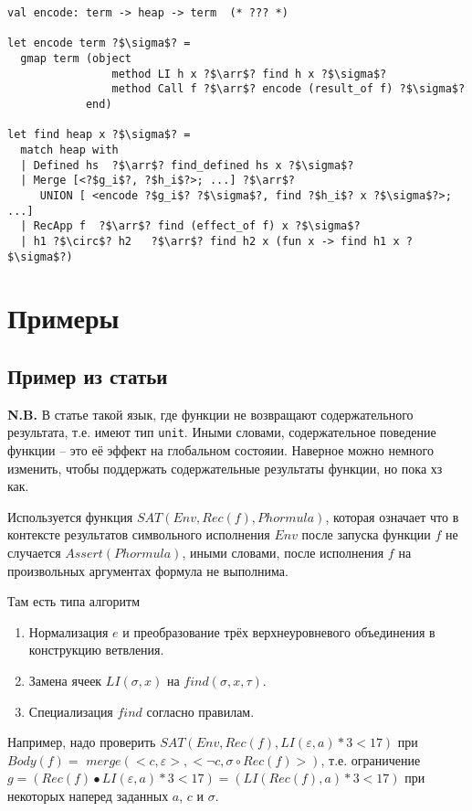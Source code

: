 \documentclass{article}
\newcommand*{\arr}{\ensuremath{\rightarrow}}
\begin{document}
\begin{verbatim}  
val encode: term -> heap -> term  (* ??? *)

let encode term ?$\sigma$? = 
  gmap term (object 
                method LI h x ?$\arr$? find h x ?$\sigma$? 
                method Call f ?$\arr$? encode (result_of f) ?$\sigma$? 
            end)

let find heap x ?$\sigma$? =
  match heap with 
  | Defined hs  ?$\arr$? find_defined hs x ?$\sigma$? 
  | Merge [<?$g_i$?, ?$h_i$?>; ...] ?$\arr$? 
     UNION [ <encode ?$g_i$? ?$\sigma$?, find ?$h_i$? x ?$\sigma$?>; ...]
  | RecApp f  ?$\arr$? find (effect_of f) x ?$\sigma$?
  | h1 ?$\circ$? h2   ?$\arr$? find h2 x (fun x -> find h1 x ?$\sigma$?)
\end{verbatim}

\section{Примеры}
\subsection{Пример из статьи}

\textbf{N.B.} В статье такой язык, где функции не возвращают содержательного результата, т.е. имеют тип \texttt{unit}. Иными словами, содержательное поведение функции -- это её эффект на глобальном состояии. Наверное можно немного изменить, чтобы поддержать содержательные результаты функции, но пока хз как.

Используется функция $SAT(Env, Rec(f), Phormula)$, которая означает что в контексте результатов символьного исполнения $Env$ после запуска функции $f$ не случается $Assert(Phormula)$, иными словами, после исполнения $f$ на произвольных аргументах формула не выполнима.

Там есть типа алгоритм
\begin{enumerate}
  \item Нормализация $e$ и преобразование трёх верхнеуровневого объединения в конструкцию ветвления.
  \item Замена ячеек $LI(\sigma,x)$  на  $find(\sigma, x, \tau)$.
  \item Специализация $find$ согласно правилам.
\end{enumerate}

Например, надо проверить $SAT(Env, Rec(f), LI(\varepsilon, a) * 3< 17)$ при $Body(f) = $
$merge(<c,\varepsilon>, <\neg c, \sigma \circ Rec(f)>)$, т.е. ограничение 
$g = (Rec(f)\bullet LI(\varepsilon,a)*3<17) = (LI(Rec(f), a)*3 < 17)$ при некоторых наперед заданных $a$, $c$ и $\sigma$.
\end{document}
